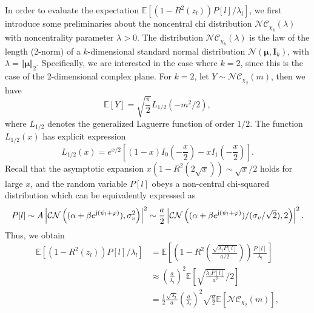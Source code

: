 \documentclass[journal,twocolumn]{IEEEtran}
\theoremstyle{nonumberplain}
\def \CN {\mathcal{CN}}
\def \nc {\mathcal{NC}}
\begin{document}
    In order to evaluate the expectation $\mathbb{E}[(1-R^2(z_l))P[l]/\lambda_l]$, we first introduce some preliminaries about the noncentral chi distribution $\nc_{\chi_k}(\lambda)$ with noncentrality parameter $\lambda>0$. The distribution $\nc_{\chi_k}(\lambda)$ is the law of the length (2-norm) of a $k$-dimensional standard normal distribution $\mathcal{N}({\bm \mu}, {\bm I}_k)$, with $\lambda = \Vert {\bm \mu} \Vert_2$. Specifically, we are interested in the case where $k=2$, since this is the case of the 2-dimensional complex plane. For  $k=2$, let $Y \sim \nc_{\chi_2}(m)$, then we have \cite{park1961moments}
    \begin{equation}
        \mathbb{E}\left[Y\right] = \sqrt{\frac{\pi}{2}}L_{1/2}(-m^2/2),
        \label{eqn:noncentral chi mean}
    \end{equation}
    where $L_{1/2}$ denotes the generalized Laguerre function  of order $1/2$. The function $L_{1/2}(x)$ has explicit expression 
    \begin{equation}
        L_{1/2}(x) = e^{x/2}\left[(1-x)I_0\left(-\frac{x}{2}\right)-xI_1\left(-\frac{x}{2}\right) \right].
        \label{eqn:Laguerre half order}
    \end{equation}
    Recall that the asymptotic expansion $x(1-R^2(2\sqrt{x})) \sim \sqrt{x}/2$ holds for large $x$,
    and the random variable $P[l]$ obeys a non-central chi-squared distribution which can be equivalently expressed as 
    \begin{equation}
        P[l] \sim A\left| \CN\left( (\alpha + \beta e^{{\rm j} (\psi_l + \varphi)}), \sigma_v^2 \right)\right|^2
        \sim \frac{a}{2} \left| \CN\left((\alpha + \beta e^{{\rm j} (\psi_l + \varphi)})/(\sigma_v / \sqrt{2}), 2\right)\right|^2.
    \end{equation}
    Thus, we obtain
    \begin{equation}
        \begin{aligned}
        \mathbb{E}[(1-R^2(z_l))P[l]/\lambda_l] & = \mathbb{E}\left[\left(1-R^2\left(\frac{\sqrt{\lambda_l P[l]}}{a/2}\right)\right)\frac{P[l]}{\lambda_l}\right] \\
        & \approx \left(\frac{a}{\lambda_l}\right)^2 \mathbb{E}\left[ \sqrt{\frac{\lambda_l P[l]}{a^2}}/2 \right]\\
        & = \frac{1}{2}\frac{\sqrt{\lambda_l}}{a}\left(\frac{a}{\lambda_l}\right)^2 \sqrt{\frac{a}{2}}\mathbb{E}\left[\nc_{\chi_2}(m)\right],\\
        \end{aligned}
        \label{eqn:approx evaluation}
    \end{equation}
\end{document}
